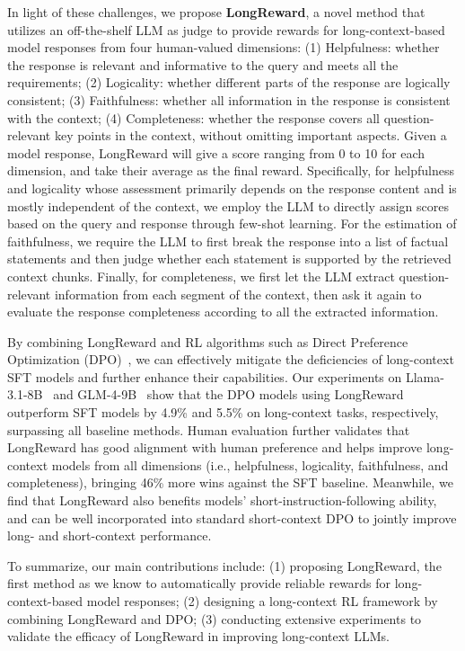 In light of these challenges, we propose \textbf{LongReward}, a novel method that utilizes an off-the-shelf LLM as judge to provide rewards for long-context-based model responses from four human-valued dimensions: (1) Helpfulness: whether the response is relevant and informative to the query and meets all the requirements; (2) Logicality: whether different parts of the response are logically consistent; (3) Faithfulness: whether all information in the response is consistent with the context; (4) Completeness: whether the response covers all question-relevant key points in the context, without omitting important aspects. Given a model response, LongReward will give a score ranging from 0 to 10 for each dimension, and take their average as the final reward. Specifically, for helpfulness and logicality whose assessment primarily depends on the response content and is mostly independent of the context, we employ the LLM to directly assign scores based on the query and response through few-shot learning. For the estimation of faithfulness, we require the LLM to first break the response into a list of factual statements and then judge whether each statement is supported by the retrieved context chunks. Finally, for completeness, we first let the LLM extract question-relevant information from each segment of the context, then ask it again to evaluate the response completeness according to all the extracted information.

By combining LongReward and RL algorithms such as Direct Preference Optimization (DPO)~\cite{dpo}, we can effectively mitigate the deficiencies of long-context SFT models and further enhance their capabilities. Our experiments on Llama-3.1-8B~\cite{llama-3-1} and GLM-4-9B~\cite{glm4} show that the DPO models using LongReward outperform SFT models by 4.9\% and 5.5\% on long-context tasks, respectively, surpassing all baseline methods. Human evaluation further validates that LongReward has good alignment with human preference and helps improve long-context models from all dimensions (i.e., helpfulness, logicality, faithfulness, and completeness), bringing 46\% more wins against the SFT baseline. Meanwhile, we find that LongReward also benefits models' short-instruction-following ability, and can be well incorporated into standard short-context DPO to jointly improve long- and short-context performance.

To summarize, our main contributions include: (1) proposing LongReward, the first method as we know to automatically provide reliable rewards for long-context-based model responses; (2) designing a long-context RL framework by combining LongReward and DPO; (3) conducting extensive experiments to validate the efficacy of LongReward in improving long-context LLMs.  

